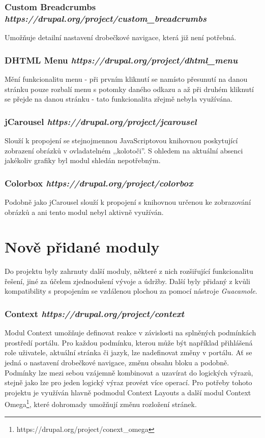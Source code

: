 \subsubsection*{\textbf{Custom Breadcrumbs} \hfill \emph{https://drupal.org/project/custom\_breadcrumbs}}
Umožňuje detailní nastavení drobečkové navigace, která již není potřebná.

\subsubsection*{\textbf{DHTML Menu} \hfill \emph{https://drupal.org/project/dhtml\_menu}}
Mění funkcionalitu menu - při prvním kliknutí se namísto přesunutí na danou stránku pouze rozbalí menu s potomky daného odkazu a až při druhém kliknutí se přejde na danou stránku - tato funkcionalita zřejmě nebyla využívána.

\subsubsection*{\textbf{jCarousel} \hfill \emph{https://drupal.org/project/jcarousel}}
Slouží k propojení se stejnojmennou JavaScriptovou knihovnou poskytující zobrazení obrázků v ovladatelném ,,kolotoči''. S ohledem na aktuální absenci jakékoliv grafiky byl modul shledán nepotřebným.
 
\subsubsection*{\textbf{Colorbox} \hfill \emph{https://drupal.org/project/colorbox}}
Podobně jako jCarousel slouží k propojení s knihovnou určenou ke zobrazování obrázků a ani tento modul nebyl aktivně využíván.

\section{Nově přidané moduly}
\label{sec:nove-moduly}
Do projektu byly zahrnuty další moduly, některé z nich rozšiřující funkcionalitu řešení, jiné za účelem zjednodušení vývoje a údržby. Další byly přidaný z kvůli kompatibility s propojením se vzdálenou plochou za pomocí nástroje \emph{Guacamole}.

\subsubsection*{\textbf{Context} \hfill \emph{https://drupal.org/project/context}} 
\label{subsec:context}
Modul Context umožňuje definovat reakce v závislosti na splněných podmínkách prostředí portálu. Pro každou podmínku, kterou může být například přihlášená role uživatele, aktuální stránka či jazyk, lze nadefinovat změny v portálu. Ať se jedná o nastavení drobečkové navigace, změnu obsahu bloku a podobně. Podmínky lze mezi sebou vzájemně kombinovat a uzavírat do logických výrazů, stejně jako lze pro jeden logický výraz provézt více operací. Pro potřeby tohoto projektu je využíván hlavně podmodul Context Layouts a další modul Context Omega\footnote{https://drupal.org/project/conext\_omega}, které dohromady umožňují změnu rozložení stránek.

